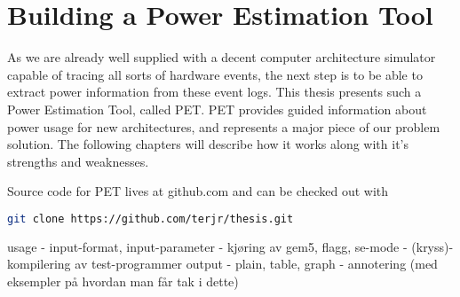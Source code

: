 \chapter{Building a Power Estimation Tool}

As we are already well supplied with a decent computer architecture simulator
capable of tracing all sorts of hardware events, the next step is to be able to
extract power information from these event logs. This thesis presents such a
Power Estimation Tool, called PET. PET provides guided information about power
usage for new architectures, and represents a major piece of our problem
solution. The following chapters will describe how it works along with it's
strengths and weaknesses.

\noindent Source code for PET lives at github.com and can be checked out with
\begin{lstlisting}[language=bash]
git clone https://github.com/terjr/thesis.git
\end{lstlisting}







usage
- input-format, input-parameter
- kjøring av gem5, flagg, se-mode
- (kryss)-kompilering av test-programmer
output
- plain, table, graph
- annotering (med eksempler på hvordan man får tak i dette)
